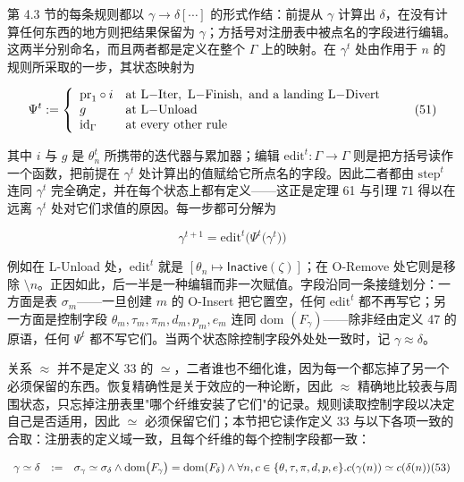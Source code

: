 第 4.3 节的每条规则都以 $\gamma \longrightarrow \delta [ \cdots ]$ 的形式作结：前提从 $\gamma$ 计算出 $\delta$，在没有计算任何东西的地方则把结果保留为 $\gamma$；方括号对注册表中被点名的字段进行编辑。这两半分别命名，而且两者都是定义在整个 $\Gamma$ 上的映射。在 $\gamma ^ { t }$ 处由作用于 $n$ 的规则所采取的一步，其状态映射为

\[
\Psi ^ { t } : = \left\{ \begin{array} { l l } { \mathrm { p r } _ { 1 } \circ i } & { \mathrm { a t ~ L \mathrm { - } I t e r , ~ L \mathrm { - } F i n i s h , ~ a n d ~ a ~ l a n d i n g ~ L \mathrm { - } D i v e r t } } \\ { g } & { \mathrm { a t ~ L \mathrm { - } U n l o a d } } \\ { \mathrm { i d } _ { \Gamma } } & { \mathrm { a t ~ e v e r y ~ o t h e r ~ r u l e } } \end{array} \right.\tag{51}
\]

其中 $i$ 与 $g$ 是 $\theta _ { n } ^ { t }$ 所携带的迭代器与累加器；编辑 $\mathrm{edit}^{t} : \Gamma \to \Gamma$ 则是把方括号读作一个函数，把前提在 $\gamma ^ { t }$ 处计算出的值赋给它所点名的字段。因此二者都由 $\mathrm{step}^{t}$ 连同 $\gamma ^ { t }$ 完全确定，并在每个状态上都有定义——这正是定理 61 与引理 71 得以在远离 $\gamma ^ { t }$ 处对它们求值的原因。每一步都可分解为

\[
\gamma ^ { t + 1 } = \mathrm { e d i t } ^ { t } \big ( \Psi ^ { t } \big ( \gamma ^ { t } \big ) \big )\tag{52}
\]

例如在 L-Unload 处，$\mathrm{edit}^{t}$ 就是 $[ \theta _ { n } \mapsto \mathsf{Inactive}(\zeta) ]$；在 O-Remove 处它则是移除 $\setminus n$。正因如此，后一半是一种编辑而非一次赋值。字段沿同一条接缝划分：一方面是表 $\sigma _ { m }$——一旦创建 $m$ 的 O-Insert 把它置空，任何 $\mathrm{edit}^{t}$ 都不再写它；另一方面是控制字段 $\theta _ { m } , \tau _ { m } , \pi _ { m } , d _ { m } , p _ { m } , e _ { m }$ 连同 dom $\left( F _ { \gamma } \right)$——除非经由定义 47 的原语，任何 $\Psi ^ { t }$ 都不写它们。当两个状态除控制字段外处处一致时，记 $\gamma \approx \delta$。

关系 $\approx$ 并不是定义 33 的 $\simeq$，二者谁也不细化谁，因为每一个都忘掉了另一个必须保留的东西。恢复精确性是关于效应的一种论断，因此 $\approx$ 精确地比较表与周围状态，只忘掉注册表里"哪个纤维安装了它们"的记录。规则读取控制字段以决定自己是否适用，因此 $\simeq$ 必须保留它们；本节把它读作定义 33 与以下各项一致的合取：注册表的定义域一致，且每个纤维的每个控制字段都一致：

\[
\begin{array} { r l r } { \gamma \simeq \delta } & { : = } & { \sigma _ { \gamma } \simeq \sigma _ { \delta } \wedge \mathrm { d o m } \big ( F _ { \gamma } \big ) = \mathrm { d o m } ( F _ { \delta } ) \wedge \forall n , c \in \{ \theta , \tau , \pi , d , p , e \} . c ( \gamma ( n ) ) \simeq c ( \delta ( n ) ) (53) } \end{array}
\]

